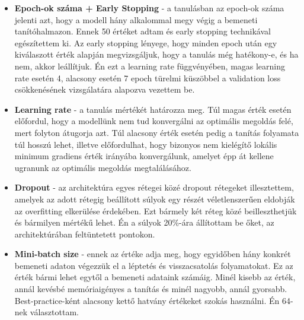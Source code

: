 \begin{itemize}
 \item \textbf{Epoch-ok száma + Early Stopping} - a tanulásban az epoch-ok száma jelenti azt, hogy a modell hány alkalommal megy végig a bemeneti tanítóhalmazon. Ennek 50 értéket adtam és early stopping technikával egészítettem ki. Az early stopping lényege, hogy minden epoch után egy kiválaszott érték alapján megvizsgáljuk, hogy a tanulás még hatékony-e, és ha nem, akkor leállítjuk. Én ezt a learning rate függvényében, magas learning rate esetén 4, alacsony esetén 7 epoch türelmi küszöbbel a validation loss csökkenésének vizsgálatára alapozva vezettem be.
 \item \textbf{Learning rate} - a tanulás mértékét határozza meg. Túl magas érték esetén előfordul, hogy a modellünk nem tud konvergálni az optimális megoldás felé, mert folyton átugorja azt. Túl alacsony érték esetén pedig a tanítás folyamata túl hosszú lehet, illetve előfordulhat, hogy bizonyos nem kielégítő lokális minimum gradiens érték irányába konvergálunk, amelyet épp át kellene ugranunk az optimális megoldás megtalálásához.
 \item \textbf{Dropout} - az architektúra egyes rétegei közé dropout rétegeket illesztettem, amelyek az adott rétegig beállított súlyok egy részét véletlenszerűen eldobják az overfitting elkerülése érdekében. Ezt bármely két réteg közé beilleszthetjük és bármilyen mértékű lehet. Én a súlyok 20\%-ára állítottam be őket, az architektúrában feltüntetett pontokon.
 \item \textbf{Mini-batch size} - ennek az értéke adja meg, hogy egyidőben hány konkrét bemeneti adaton végezzük el a léptetés és visszacsatolás folyamatokat. Ez az érték bármi lehet egytől a bemeneti adataink számáig. Minél kisebb az érték, annál kevésbé memóriaigényes a tanítás és minél nagyobb, annál gyorsabb. Best-practice-ként alacsony kettő hatvány értékeket szokás használni. Én 64-nek választottam.
\end{itemize}
